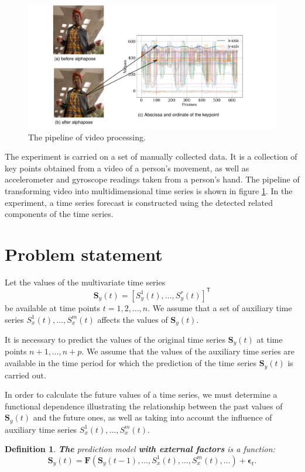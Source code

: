 \documentclass[bst/sn-mathphys]{sn-jnl}%
\newcommand{\bS}{\mathbf{S}}
\newcommand{\bF}{\mathbf{F}}
\renewcommand{\T}{^{\mathsf{T}}}
\theoremstyle{thmstyleone}%
\theoremstyle{thmstyletwo}%
\theoremstyle{thmstylethree}%
\newtheorem{definition}{Definition}%
\begin{document}
\begin{figure}
	\includegraphics[width=\textwidth]{alphapose_pipeline.pdf}
	\caption{The pipeline of video processing.}
	\label{fig:alphapose_pipeline}
\end{figure}

The experiment is carried on a set of manually collected data. 
It is a collection of key points obtained from a video of a person's movement, as well as accelerometer and gyroscope readings taken from a person's hand.
The pipeline of transforming video into multidimensional time series is shown in figure \ref{fig:alphapose_pipeline}.
In the experiment, a time series forecast is constructed using the detected related components of the time series.

\section{Problem statement}
Let the values of the multivariate time series 
\[ \bS_y(t) = [S_y^1(t), \ldots, S_y^r(t)] \T \]
be available at time points $t = 1, 2, \ldots, n$.
We assume that a set of auxiliary time series $S_x^1(t), \ldots, S_x^m(t)$ affects the values of $\bS_y(t)$.

It is necessary to predict the values of the original time series $\bS_y(t)$ at time points $n+1, \ldots, n+p$.
We assume that the values of the auxiliary time series are available in the time period for which the prediction of the time series $\bS_y(t)$ is carried out.

In order to calculate the future values of a time series, we must determine a functional dependence illustrating the relationship between the past values of $\bS_y(t)$ and the future ones, as well as taking into account the influence of auxiliary time series $S_x^1(t), \ldots, S_x^m(t)$.

\begin{definition}
	\textbf{The} \emph{prediction model} \textbf{with external factors} is a function:
	\begin{equation*}
		\bS_y(t) = \bF(\bS_y(t-1), \ldots, S_x^1(t), \ldots, S_x^m(t), \ldots) + \boldsymbol{\epsilon}_t.
	\end{equation*}
\end{definition}
\end{document}

